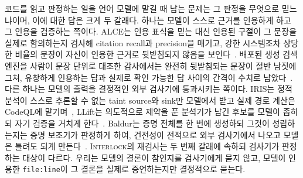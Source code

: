 \documentclass[acmsmall,screen,review,anonymous]{acmart}
\begin{document}
코드를 읽고 판정하는 일을 언어 모델에 맡길 때 남는 문제는 그 판정을 무엇으로 믿느냐이며, 이에 대한 답은 크게 두 갈래다. 하나는 모델이 스스로 근거를 인용하게 하고 그 인용을 검증하는 쪽이다. ALCE는 인용 표식을 믿는 대신 인용된 구절이 그 문장을 실제로 함의하는지 검사해 citation recall과 precision을 매기고, 강한 시스템조차 상당한 비율의 문장이 자신이 인용한 근거로 뒷받침되지 않음을 보인다~\cite{gao2023enabling}. 배포된 생성 검색 엔진을 사람이 문장 단위로 대조한 감사에서는 완전히 뒷받침되는 문장이 절반 남짓에 그쳐, 유창하게 인용하는 답과 실제로 확인 가능한 답 사이의 간격이 수치로 남았다~\cite{liu2023evaluating}. 다른 하나는 모델의 출력을 결정적인 외부 검사기에 통과시키는 쪽이다. IRIS는 정적 분석이 스스로 추론할 수 없는 taint source와 sink만 모델에서 받고 실제 경로 계산은 CodeQL에 맡기며~\cite{li2025iris}, LLift는 의도적으로 제약을 푼 분석기가 남긴 후보를 모델이 좁히되 자기 검증을 거치게 한다~\cite{li2024llift}. Baldur는 증명 전체를 한 번에 생성하되 그것이 성립하는지는 증명 보조기가 판정하게 하여, 건전성이 전적으로 외부 검사기에서 나오고 모델은 틀려도 되게 만든다~\cite{first2023baldur}. \textsc{Interlock}의 재검사는 두 번째 갈래에 속하되 검사기가 판정하는 대상이 다르다. 우리는 모델의 결론이 참인지를 검사기에게 묻지 않고, 모델이 인용한 \texttt{file:line}이 그 결론을 실제로 증언하는지만 결정적으로 묻는다.
\end{document}
